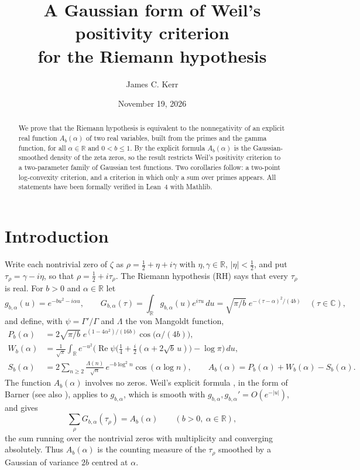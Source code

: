 \documentclass[11pt]{amsart}
\theoremstyle{remark}
\newcommand{\R}{\mathbb{R}}
\DeclareMathOperator{\re}{Re}
\begin{document}
\title[A Gaussian form of Weil's positivity criterion]{A Gaussian form of Weil's positivity criterion\\ for the Riemann hypothesis}
\author{James C. Kerr}
\date{November 19, 2026}
\begin{abstract}
We prove that the Riemann hypothesis is equivalent to the nonnegativity of an explicit real function
$A_b(\alpha)$ of two real variables, built from the primes and the gamma function, for all $\alpha\in\R$ and $0<b\le 1$.
By the explicit formula $A_b(\alpha)$ is the Gaussian-smoothed density of the zeta zeros, so the result
restricts Weil's positivity criterion to a two-parameter family of Gaussian test functions.
Two corollaries follow: a two-point log-convexity criterion, and a criterion in which only a sum over
primes appears. All statements have been formally verified in Lean~4 with Mathlib.
\end{abstract}
\maketitle

\section{Introduction}
Write each nontrivial zero of $\zeta$ as $\rho=\tfrac12+\eta+i\gamma$ with $\eta,\gamma\in\R$,
$|\eta|<\tfrac12$, and put $\tau_\rho=\gamma-i\eta$, so that $\rho=\tfrac12+i\tau_\rho$. The Riemann
hypothesis (RH) says that every $\tau_\rho$ is real. For $b>0$ and $\alpha\in\R$ let
\[
g_{b,\alpha}(u)=e^{-bu^2-i\alpha u},\qquad
G_{b,\alpha}(\tau)=\int_{\R}g_{b,\alpha}(u)e^{i\tau u}\,du=\sqrt{\pi/b}\;e^{-(\tau-\alpha)^2/(4b)}\quad(\tau\in\mathbb{C}),
\]
and define, with $\psi=\Gamma'/\Gamma$ and $\Lambda$ the von Mangoldt function,
\begin{align*}
P_b(\alpha)&=2\sqrt{\pi/b}\;e^{(1-4\alpha^2)/(16b)}\cos\!\big(\alpha/(4b)\big),\\
W_b(\alpha)&=\frac{1}{\sqrt\pi}\int_{\R}e^{-u^2}\Big(\re\psi\big(\tfrac14+\tfrac i2(\alpha+2\sqrt b\,u)\big)-\log\pi\Big)\,du,\\
S_b(\alpha)&=2\sum_{n\ge2}\frac{\Lambda(n)}{\sqrt n}\,e^{-b\log^2 n}\cos(\alpha\log n),\qquad
A_b(\alpha)=P_b(\alpha)+W_b(\alpha)-S_b(\alpha).
\end{align*}
The function $A_b(\alpha)$ involves no zeros. Weil's explicit formula \cite{Weil}, in the form of Barner
\cite{Barner} (see also \cite[Ch.~XVII]{Lang}), applies to $g_{b,\alpha}$, which is smooth with
$g_{b,\alpha},g_{b,\alpha}'=O(e^{-|u|})$, and gives
\begin{equation}\label{eq:EF}
\sum_\rho G_{b,\alpha}(\tau_\rho)=A_b(\alpha)\qquad(b>0,\ \alpha\in\R),
\end{equation}
the sum running over the nontrivial zeros with multiplicity and converging absolutely. Thus $A_b(\alpha)$
is the counting measure of the $\tau_\rho$ smoothed by a Gaussian of variance $2b$ centred at $\alpha$.
\end{document}
